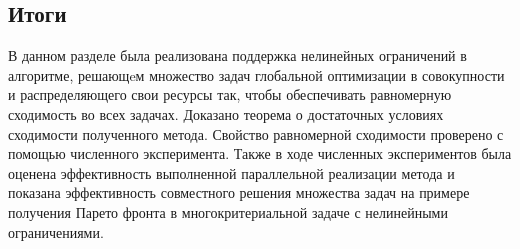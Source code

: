 \subsection{Итоги}

В данном разделе была реализована поддержка нелинейных ограничений в алгоритме, решающeм
множество задач глобальной оптимизации в совокупности и распределяющего свои ресурсы так, чтобы
обеспечивать равномерную сходимость во всех задачах. Доказано теорема о достаточных условиях сходимости
полученного метода. Свойство равномерной сходимости проверено с помощью численного эксперимента.
Также в ходе численных экспериментов была оценена эффективность выполненной параллельной реализации метода и
показана эффективность совместного решения множества задач на примере получения Парето фронта в многокритериальной задаче с
нелинейными ограничениями.
